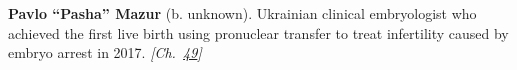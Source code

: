 \textbf{Pavlo ``Pasha'' Mazur} (b. unknown). Ukrainian clinical embryologist who achieved the first live birth using pronuclear transfer to treat infertility caused by embryo arrest in 2017. \emph{[Ch.~\hyperref[ch:ivfmtdna]{49}]}


